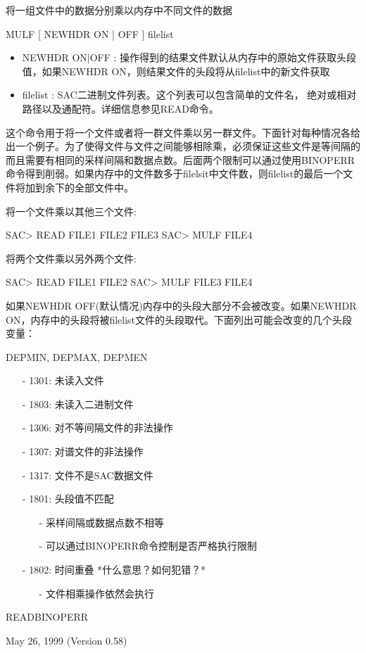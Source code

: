 \label{cmd:mulf}

将一组文件中的数据分别乘以内存中不同文件的数据

MULF [ NEWHDR ON | OFF ] filelist

\begin{itemize}
\item NEWHDR ON|OFF : 操作得到的结果文件默认从内存中的原始文件获取头段值，如果NEWHDR ON，则结果文件的头段将从filelist中的新文件获取 
\item filelist : SAC二进制文件列表。这个列表可以包含简单的文件名， 绝对或相对路径以及通配符。详细信息参见READ命令。
\end{itemize}

这个命令用于将一个文件或者将一群文件乘以另一群文件。下面针对每种情况各给出一个例子。为了使得文件与文件之间能够相除乘，必须保证这些文件是等间隔的而且需要有相同的采样间隔和数据点数。后面两个限制可以通过使用BINOPERR命令得到削弱。如果内存中的文件数多于filelsit中文件数，则filelist的最后一个文件将加到余下的全部文件中。

将一个文件乘以其他三个文件:
\begin{SACCode}
SAC> READ FILE1 FILE2 FILE3
SAC> MULF FILE4
\end{SACCode}

将两个文件乘以另外两个文件:
\begin{SACCode}
SAC> READ FILE1 FILE2
SAC> MULF FILE3 FILE4
\end{SACCode}

如果NEWHDR OFF(默认情况)内存中的头段大部分不会被改变。如果NEWHDR ON，内存中的头段将被filelist文件的头段取代。下面列出可能会改变的几个头段变量：

DEPMIN, DEPMAX, DEPMEN

\begin{itemize}
\item[-]1301: 未读入文件
\item[-]1803: 未读入二进制文件
\item[-]1306: 对不等间隔文件的非法操作
\item[-]1307: 对谱文件的非法操作
\item[-]1317: 文件不是SAC数据文件
\item[-]1801: 头段值不匹配
	\begin{itemize}
	\item[-]采样间隔或数据点数不相等
	\item[-]可以通过BINOPERR命令控制是否严格执行限制
	\end{itemize}
\end{itemize}

\begin{itemize}
\item[-]1802: 时间重叠  *什么意思？如何犯错？*
	\begin{itemize}
	\item[-]文件相乘操作依然会执行
	\end{itemize}
\end{itemize}

READBINOPERR

May 26, 1999 (Version 0.58)
